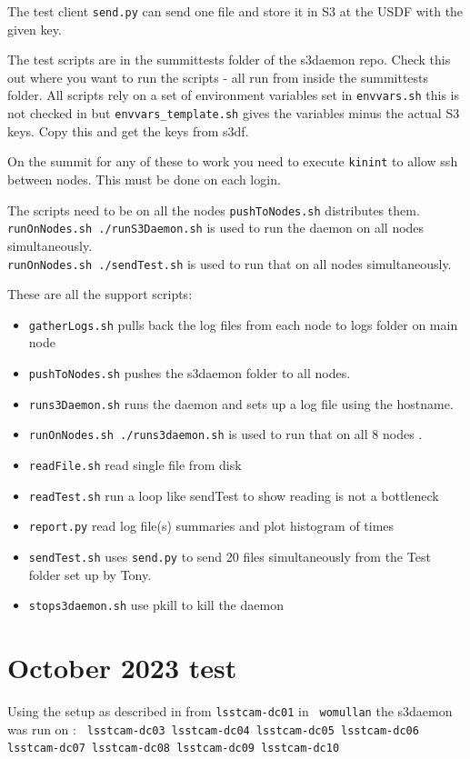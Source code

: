 The test client  {\tt send.py} can send one file and store it in S3 at the USDF with the given key.

The test scripts are in the summittests folder of the s3daemon repo.
Check this out where you want to run the scripts - all run from inside the summittests folder.
All scripts rely on a set of environment variables set in {\tt envvars.sh} this is not checked in but {\tt envvars\_template.sh} gives the variables minus the actual S3 keys. Copy this and get the keys from s3df.

On the summit for any of these to work you need to execute {\tt kinint} to allow ssh between nodes.
This must be done on each login.

The scripts need to be on all the nodes {\tt pushToNodes.sh} distributes them.\\
{\tt runOnNodes.sh ./runS3Daemon.sh} is used to run the daemon on all nodes simultaneously.\\
{\tt runOnNodes.sh ./sendTest.sh} is used to run that on all nodes simultaneously.

These  are all the support scripts:
\begin{itemize}
\item {\tt gatherLogs.sh} pulls back the log files from each node to logs folder on main node
\item {\tt pushToNodes.sh} pushes the s3daemon folder to all nodes.
\item {\tt runs3Daemon.sh} runs the daemon and sets up a log file using the hostname.
\item {\tt runOnNodes.sh ./runs3daemon.sh} is used to run that on all 8 nodes .
\item {\tt readFile.sh}  read  single file from disk
\item {\tt readTest.sh}  run a loop like sendTest to show reading is not a bottleneck
\item {\tt report.py}  read log file(s) summaries and plot histogram of times
\item {\tt sendTest.sh} uses {\tt send.py} to send 20 files simultaneously from the Test folder set up by Tony.
\item {\tt stops3daemon.sh}  use pkill to kill the daemon
\end{itemize}


\section{October 2023 test} \label{sec:oct2023}
Using the setup as described in  from {\tt lsstcam-dc01} in  {\tt ~womullan}
the s3daemon was run on : {\tt
 lsstcam-dc03 lsstcam-dc04 lsstcam-dc05 lsstcam-dc06 lsstcam-dc07 lsstcam-dc08 lsstcam-dc09 lsstcam-dc10
}

